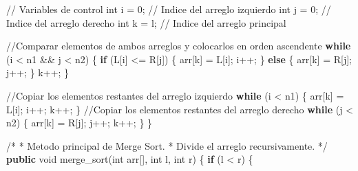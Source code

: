 \documentclass[
  spanish,
  letterpaper,
  DIV=11,
  numbers=noendperiod]{scrreprt}
\newenvironment{Shaded}{\begin{snugshade}}{\end{snugshade}}
\newcommand{\CommentTok}[1]{\textcolor[rgb]{0.37,0.37,0.37}{#1}}
\newcommand{\ControlFlowTok}[1]{\textcolor[rgb]{0.00,0.23,0.31}{\textbf{#1}}}
\newcommand{\DataTypeTok}[1]{\textcolor[rgb]{0.68,0.00,0.00}{#1}}
\newcommand{\DecValTok}[1]{\textcolor[rgb]{0.68,0.00,0.00}{#1}}
\newcommand{\FunctionTok}[1]{\textcolor[rgb]{0.28,0.35,0.67}{#1}}
\newcommand{\KeywordTok}[1]{\textcolor[rgb]{0.00,0.23,0.31}{\textbf{#1}}}
\newcommand{\NormalTok}[1]{\textcolor[rgb]{0.00,0.23,0.31}{#1}}
\newcommand{\OperatorTok}[1]{\textcolor[rgb]{0.37,0.37,0.37}{#1}}
\begin{document}
\begin{Shaded}
\begin{Highlighting}[]
        \CommentTok{// Variables de control}
        \DataTypeTok{int}\NormalTok{ i }\OperatorTok{=} \DecValTok{0}\OperatorTok{;} \CommentTok{// Indice del arreglo izquierdo}
        \DataTypeTok{int}\NormalTok{ j }\OperatorTok{=} \DecValTok{0}\OperatorTok{;} \CommentTok{// Indice del arreglo derecho}
        \DataTypeTok{int}\NormalTok{ k }\OperatorTok{=}\NormalTok{ l}\OperatorTok{;} \CommentTok{// Indice del arreglo principal}


        \CommentTok{//Comparar elementos de ambos arreglos y colocarlos en orden ascendente}
        \ControlFlowTok{while} \OperatorTok{(}\NormalTok{i }\OperatorTok{\textless{}}\NormalTok{ n1 }\OperatorTok{\&\&}\NormalTok{ j }\OperatorTok{\textless{}}\NormalTok{ n2}\OperatorTok{)} \OperatorTok{\{}
            \ControlFlowTok{if} \OperatorTok{(}\NormalTok{L}\OperatorTok{[}\NormalTok{i}\OperatorTok{]} \OperatorTok{\textless{}=}\NormalTok{ R}\OperatorTok{[}\NormalTok{j}\OperatorTok{])} \OperatorTok{\{}
\NormalTok{                arr}\OperatorTok{[}\NormalTok{k}\OperatorTok{]} \OperatorTok{=}\NormalTok{ L}\OperatorTok{[}\NormalTok{i}\OperatorTok{];}
\NormalTok{                i}\OperatorTok{++;}
            \OperatorTok{\}} \ControlFlowTok{else} \OperatorTok{\{}
\NormalTok{                arr}\OperatorTok{[}\NormalTok{k}\OperatorTok{]} \OperatorTok{=}\NormalTok{ R}\OperatorTok{[}\NormalTok{j}\OperatorTok{];}
\NormalTok{                j}\OperatorTok{++;}
            \OperatorTok{\}}
\NormalTok{            k}\OperatorTok{++;}
        \OperatorTok{\}}

        \CommentTok{//Copiar los elementos restantes del arreglo izquierdo}
        \ControlFlowTok{while} \OperatorTok{(}\NormalTok{i }\OperatorTok{\textless{}}\NormalTok{ n1}\OperatorTok{)} \OperatorTok{\{}
\NormalTok{            arr}\OperatorTok{[}\NormalTok{k}\OperatorTok{]} \OperatorTok{=}\NormalTok{ L}\OperatorTok{[}\NormalTok{i}\OperatorTok{];}
\NormalTok{            i}\OperatorTok{++;}
\NormalTok{            k}\OperatorTok{++;}
        \OperatorTok{\}}
        \CommentTok{//Copiar los elementos restantes del arreglo derecho}
        \ControlFlowTok{while} \OperatorTok{(}\NormalTok{j }\OperatorTok{\textless{}}\NormalTok{ n2}\OperatorTok{)} \OperatorTok{\{}
\NormalTok{            arr}\OperatorTok{[}\NormalTok{k}\OperatorTok{]} \OperatorTok{=}\NormalTok{ R}\OperatorTok{[}\NormalTok{j}\OperatorTok{];}
\NormalTok{            j}\OperatorTok{++;}
\NormalTok{            k}\OperatorTok{++;}
        \OperatorTok{\}}
    \OperatorTok{\}}

    \CommentTok{/*}
\CommentTok{     * Metodo principal de Merge Sort.}
\CommentTok{     * Divide el arreglo recursivamente.}
\CommentTok{     */}
    \KeywordTok{public} \DataTypeTok{void} \FunctionTok{merge\_sort}\OperatorTok{(}\DataTypeTok{int}\NormalTok{ arr}\OperatorTok{[],} \DataTypeTok{int}\NormalTok{ l}\OperatorTok{,} \DataTypeTok{int}\NormalTok{ r}\OperatorTok{)} \OperatorTok{\{}
        \ControlFlowTok{if} \OperatorTok{(}\NormalTok{l }\OperatorTok{\textless{}}\NormalTok{ r}\OperatorTok{)} \OperatorTok{\{}
          

\end{Highlighting}
\end{Shaded}
\end{document}
